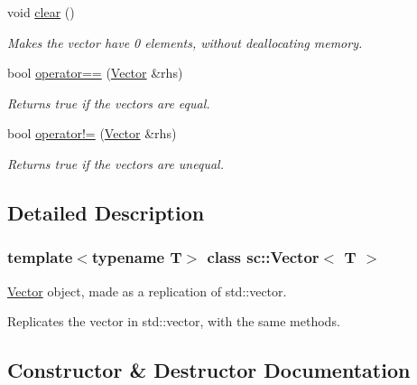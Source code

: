 \begin{DoxyCompactItemize}
void \hyperlink{classsc_1_1Vector_a312f07c5f7a6fdf16c2f88d24ed2a95f}{clear} ()
\begin{DoxyCompactList}\small\item\em Makes the vector have 0 elements, without deallocating memory. \end{DoxyCompactList}\item 
\mbox{\label{classsc_1_1Vector_acc2772115b77323077d40ade3acf6c26}} 
bool \hyperlink{classsc_1_1Vector_acc2772115b77323077d40ade3acf6c26}{operator==} (\hyperlink{classsc_1_1Vector}{Vector} \&rhs)
\begin{DoxyCompactList}\small\item\em Returns true if the vectors are equal. \end{DoxyCompactList}\item 
\mbox{\label{classsc_1_1Vector_a6456296abc5b13a763e0f1938e17dae7}} 
bool \hyperlink{classsc_1_1Vector_a6456296abc5b13a763e0f1938e17dae7}{operator!=} (\hyperlink{classsc_1_1Vector}{Vector} \&rhs)
\begin{DoxyCompactList}\small\item\em Returns true if the vectors are unequal. \end{DoxyCompactList}\end{DoxyCompactItemize}


\subsection{Detailed Description}
\subsubsection*{template$<$typename T$>$\newline
class sc\+::\+Vector$<$ T $>$}

\hyperlink{classsc_1_1Vector}{Vector} object, made as a replication of std\+::vector. 

Replicates the vector in std\+::vector, with the same methods. 

\subsection{Constructor \& Destructor Documentation}
\mbox{\label{classsc_1_1Vector_a4832f9a5721078c4d2c89370f0fd96d0}} 
